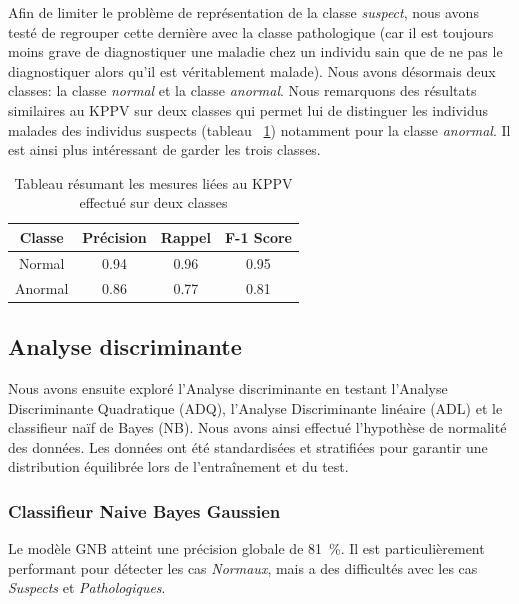 \documentclass[twocolumn,10pt]{article}
\begin{document}
Afin de limiter le problème de représentation de la classe \textit{suspect}, nous avons testé de regrouper cette dernière avec la classe pathologique (car il est toujours moins grave de diagnostiquer une maladie chez un individu sain que de ne pas le diagnostiquer alors qu'il est véritablement malade). Nous avons désormais deux classes: la classe \textit{normal} et la classe \textit{anormal}. Nous remarquons des résultats similaires au KPPV sur deux classes qui permet lui de distinguer les individus malades des individus suspects (tableau ~\ref{tab:kppv_2_classes}) notamment pour la classe \textit{anormal}. Il est ainsi plus intéressant de garder les trois classes.
\begin{table}[htbp]
\begin{center}
\caption{\label{tab:kppv_2_classes}Tableau résumant les mesures liées au KPPV effectué sur deux classes}
\begin{tabular}{cccc}
\toprule
Classe & Précision & Rappel & F-1 Score \\
\midrule
Normal & 0.94 & 0.96 & 0.95 \\
Anormal & 0.86 & 0.77 & 0.81 \\

\bottomrule
\end{tabular}
\end{center}
\end{table}

\subsection{Analyse discriminante}\label{subsec:sup:ad}

Nous avons ensuite exploré l'Analyse discriminante en testant l'Analyse Discriminante Quadratique (ADQ), l'Analyse Discriminante linéaire (ADL) et le classifieur naïf de Bayes (NB). Nous avons ainsi effectué l'hypothèse de normalité des données.
Les données ont été standardisées et stratifiées pour garantir une distribution équilibrée lors de l'entraînement et du test.


\subsubsection{Classifieur Naive Bayes Gaussien}\label{subsubsec:sup:ad:gnb}
Le modèle GNB atteint une précision globale de 81~\%. Il est particulièrement performant pour détecter les cas \textit{Normaux}, mais a des difficultés avec les cas \textit{Suspects} et \textit{Pathologiques}.
\end{document}
